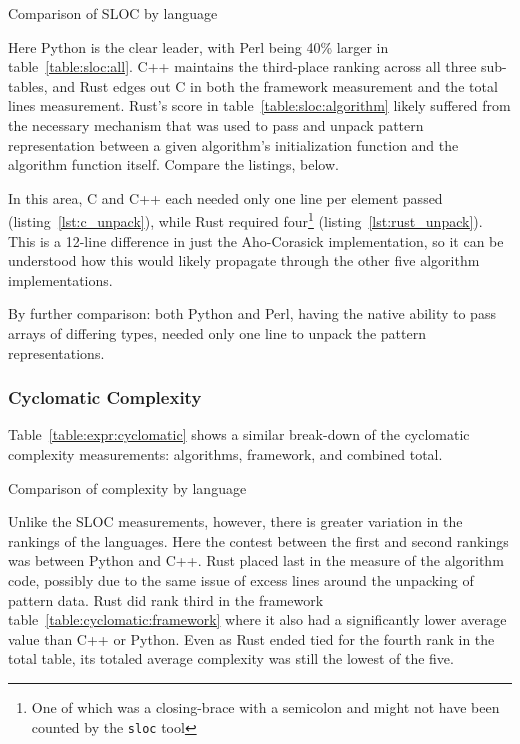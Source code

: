 \begin{table}[!htb]

\caption{Comparison of SLOC by language}
\label{table:expr:sloc}
\end{table}

Here Python is the clear leader, with Perl being 40\% larger in table~\ref{table:sloc:all}. C++ maintains the third-place ranking across all three sub-tables, and Rust edges out C in both the framework measurement and the total lines measurement. Rust's score in table~\ref{table:sloc:algorithm} likely suffered from the necessary mechanism that was used to pass and unpack pattern representation between a given algorithm's initialization function and the algorithm function itself. Compare the listings, below.





In this area, C and C++ each needed only one line per element passed (listing~\ref{lst:c_unpack}), while Rust required four\footnote{One of which was a closing-brace with a semicolon and might not have been counted by the \texttt{sloc} tool} (listing~\ref{lst:rust_unpack}). This is a 12-line difference in just the Aho-Corasick implementation, so it can be understood how this would likely propagate through the other five algorithm implementations.

By further comparison: both Python and Perl, having the native ability to pass arrays of differing types, needed only one line to unpack the pattern representations.

\subsubsection{Cyclomatic Complexity}
\label{subsubsec:complexity}

Table~\ref{table:expr:cyclomatic} shows a similar break-down of the cyclomatic complexity measurements: algorithms, framework, and combined total.

\begin{table}[!htb]

\caption{Comparison of complexity by language}
\label{table:expr:cyclomatic}
\end{table}

Unlike the SLOC measurements, however, there is greater variation in the rankings of the languages. Here the contest between the first and second rankings was between Python and C++. Rust placed last in the measure of the algorithm code, possibly due to the same issue of excess lines around the unpacking of pattern data. Rust did rank third in the framework table~\ref{table:cyclomatic:framework} where it also had a significantly lower average value than C++ or Python. Even as Rust ended tied for the fourth rank in the total table, its totaled average complexity was still the lowest of the five.

